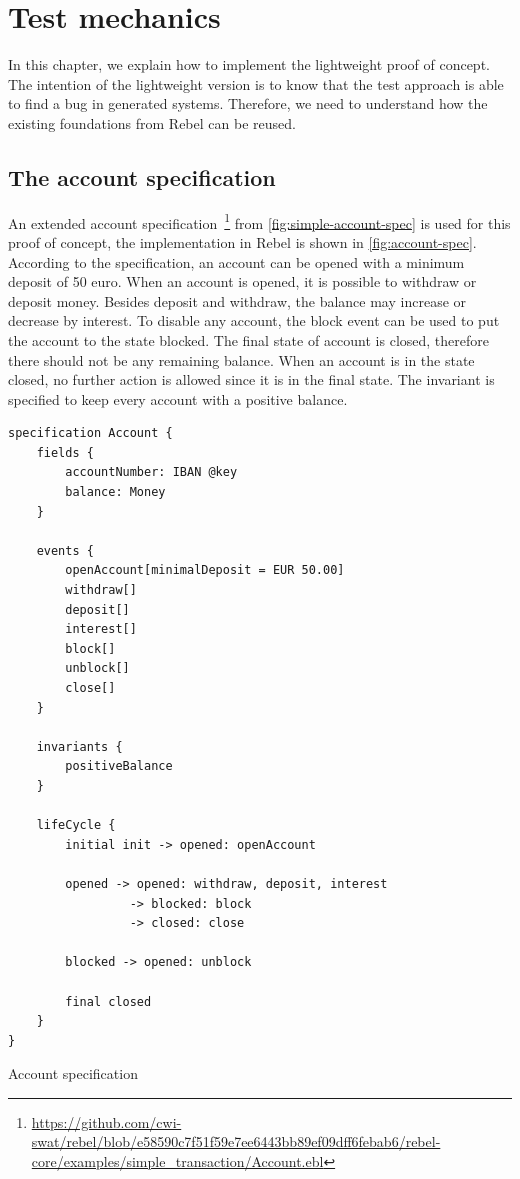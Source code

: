 \chapter{Test mechanics}\label{sec:ch3}

In this chapter, we explain how to implement the lightweight proof of concept. The intention of the lightweight version is to know that the test approach is able to find a bug in generated systems. Therefore, we need to understand how the existing foundations from Rebel can be reused.


\section{The account specification}
An extended account specification~\footnote{\url{https://github.com/cwi-swat/rebel/blob/e58590c7f51f59e7ee6443bb89ef09dff6febab6/rebel-core/examples/simple_transaction/Account.ebl}} from \autoref{fig:simple-account-spec} is used for this proof of concept, the implementation in Rebel is shown in \autoref{fig:account-spec}. According to the specification, an account can be opened with a minimum deposit of 50 euro. When an account is opened, it is possible to withdraw or deposit money. Besides deposit and withdraw, the balance may increase or decrease by interest. To disable any account, the block event can be used to put the account to the state blocked. The final state of account is closed, therefore there should not be any remaining balance. When an account is in the state closed, no further action is allowed since it is in the final state. The invariant is specified to keep every account with a positive balance.


\begin{sourcecode}[h!]
\begin{lstlisting}[]
specification Account {
	fields {
		accountNumber: IBAN @key
		balance: Money
	}

	events {
		openAccount[minimalDeposit = EUR 50.00]
		withdraw[]
		deposit[]
		interest[]
		block[]
		unblock[]
		close[]
	}

	invariants {
		positiveBalance
	}

	lifeCycle {
		initial init -> opened: openAccount

		opened -> opened: withdraw, deposit, interest
			     -> blocked: block
			     -> closed: close

		blocked -> opened: unblock

		final closed
	}
}
\end{lstlisting}
\caption{Account specification}\label{fig:account-spec}
\end{sourcecode}
\FloatBarrier

